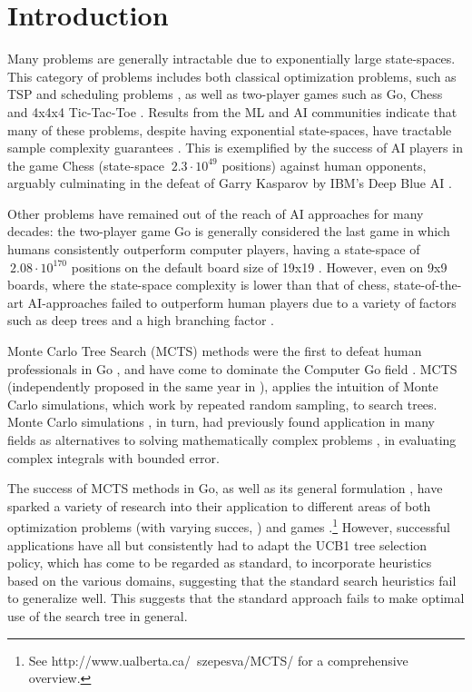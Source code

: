 \section{Introduction}
Many problems are generally intractable due to exponentially large state-spaces. This category of problems includes both classical optimization problems, such as TSP and scheduling problems \cite{browne2012survey}, as well as two-player games such as Go, Chess and 4x4x4 Tic-Tac-Toe \cite{chaslot2010monte, sharma2008knowledge}.
Results from the ML and AI communities indicate that many of these problems, despite having exponential state-spaces, have tractable sample complexity guarantees \cite{sharma2008knowledge}. This is exemplified by the success of AI players in the game Chess (state-space $~ 2.3 \cdot 10^{49}$ positions) against human opponents, arguably culminating in the defeat of Garry Kasparov by IBM's Deep Blue AI \cite{campbell2002deep}.

Other problems have remained out of the reach of AI approaches for many decades: the two-player game Go is generally considered the last game in which humans consistently outperform computer players, having a state-space of $~2.08 \cdot 10^{170}$ positions on the default board size of 19x19 \cite{tromp2007combinatorics}. However, even on 9x9 boards, where the state-space complexity is lower than that of chess, state-of-the-art AI-approaches failed to outperform human players due to a variety of factors such as deep trees and a high branching factor \cite{browne2012survey}.

Monte Carlo Tree Search (MCTS) methods were the first to defeat human professionals in Go \cite{coulom2007efficient}, and have come to dominate the Computer Go field \cite{chaslot2010monte}. MCTS (independently proposed in the same year in \cite{coulom2007efficient, kocsis2006bandit, chaslot2006monte}), applies the intuition of Monte Carlo simulations, which work by repeated random sampling, to search trees. Monte Carlo simulations \cite{metropolis1985monte}, in turn, had previously found application in many fields as alternatives to solving mathematically complex problems \cite{liu2008monte}, \eg in evaluating complex integrals with bounded error.

The success of MCTS methods in Go, as well as its general formulation \cite{chaslot2010monte}, have sparked a variety of research into their application to different areas of both optimization problems (with varying succes, \eg \cite{rimmel2011optimization, cazenave2009monte}) and games \cite{schadd2008single, gelly2012grand}.\footnote{See http://www.ualberta.ca/~szepesva/MCTS/ for a comprehensive overview.} However, successful applications have all but consistently had to adapt the UCB1 tree selection policy, which has come to be regarded as standard, to incorporate heuristics based on the various domains, suggesting that the standard search heuristics fail to generalize well. This suggests that the standard approach fails to make optimal use of the search tree in general.

